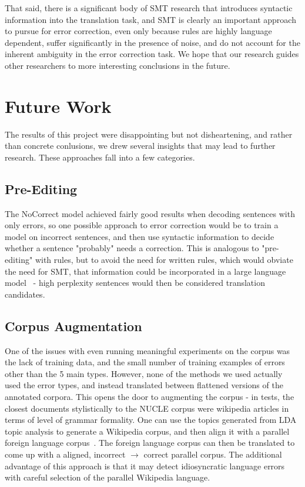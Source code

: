 \documentclass[11pt,letterpaper]{article}
\begin{document}
That said, there is a significant body of SMT research that introduces syntactic information into the translation task, and SMT is clearly an important approach to pursue for error correction, even only because rules are highly language dependent, suffer significantly in the presence of noise, and do not account for the inherent ambiguity in the error correction task. We hope that our research guides other researchers to more interesting conclusions in the future.

\section{Future Work}

The results of this project were disappointing but not disheartening, and rather than concrete conlusions, we drew several insights that may lead to further research. These approaches fall into a few categories.

\subsection{Pre-Editing}

The NoCorrect model achieved fairly good results when decoding sentences with only errors, so one possible approach to error correction would be to train a model on incorrect sentences, and then use syntactic information to decide whether a sentence  "probably" needs a correction. This is analogous to "pre-editing" with rules, but to avoid the need for written rules, which would obviate the need for SMT, that information could be incorporated in a large language model~\cite{largelm} - high perplexity sentences would then be considered translation candidates.

\subsection{Corpus Augmentation}

One of the issues with even running meaningful experiments on the corpus was the lack of training data, and the small number of training examples of errors other than the 5 main types. However, none of the methods we used actually used the error types, and instead translated between flattened versions of the annotated corpora. This opens the door to augmenting the corpus - in tests, the closest documents stylistically to the NUCLE corpus were wikipedia articles in terms of level of grammar formality. One can use the topics generated from LDA topic analysis to generate a Wikipedia corpus, and then align it with a parallel foreign language corpus~\cite{wiki}. The foreign language corpus can then be translated to come up with a aligned, incorrect $\rightarrow$ correct parallel corpus. The additional advantage of this approach is that it may detect idiosyncratic language errors with careful selection of the parallel Wikipedia language.
\end{document}
